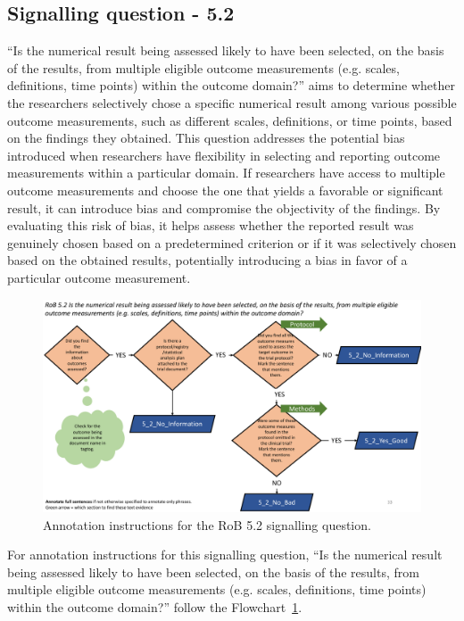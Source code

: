 \documentclass[sn-mathphys,Numbered]{sn-jnl}%
\begin{document}
\subsection*{Signalling question - 5.2 }
\label{subsec:5_2}
%
``Is the numerical result being assessed likely to have been selected, on the basis of the results, from multiple eligible outcome measurements (e.g. scales, definitions, time points) within the outcome domain?'' aims to determine whether the researchers selectively chose a specific numerical result among various possible outcome measurements, such as different scales, definitions, or time points, based on the findings they obtained.
This question addresses the potential bias introduced when researchers have flexibility in selecting and reporting outcome measurements within a particular domain.
If researchers have access to multiple outcome measurements and choose the one that yields a favorable or significant result, it can introduce bias and compromise the objectivity of the findings. 
By evaluating this risk of bias, it helps assess whether the reported result was genuinely chosen based on a predetermined criterion or if it was selectively chosen based on the obtained results, potentially introducing a bias in favor of a particular outcome measurement.
%
%
%
\begin{figure}[htbp]
    \centering
    \includegraphics[width=\textwidth]{figures/5_2.pdf}
    \caption{Annotation instructions for the RoB 5.2 signalling question.}
    \label{fig:5_2}
\end{figure}
%
%
%

For annotation instructions for this signalling question, ``Is the numerical result being assessed likely to have been selected, on the basis of the results, from multiple eligible outcome measurements (e.g. scales, definitions, time points) within the outcome domain?'' follow the Flowchart~\ref{fig:5_2}.
\end{document}
